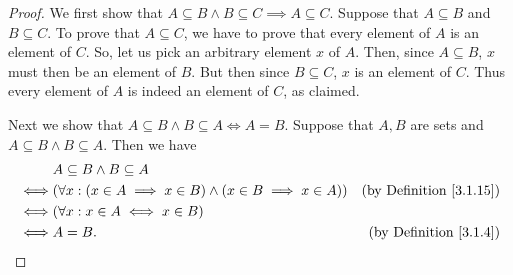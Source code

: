 \begin{proof}
    We first show that \(A \subseteq B \land B \subseteq C \implies A \subseteq C\).
    Suppose that \(A \subseteq B\) and \(B \subseteq C\).
    To prove that \(A \subseteq C\), we have to prove that every element of \(A\) is an element of \(C\).
    So, let us pick an arbitrary element \(x\) of \(A\).
    Then, since \(A \subseteq B\), \(x\) must then be an element of \(B\).
    But then since \(B \subseteq C\), \(x\) is an element of \(C\).
    Thus every element of \(A\) is indeed an element of \(C\), as claimed.

    Next we show that \(A \subseteq B \land B \subseteq A \iff A = B\).
    Suppose that \(A, B\) are sets and \(A \subseteq B \land B \subseteq A\).
    Then we have
    \begin{align*}
             & A \subseteq B \land B \subseteq A                                                                               \\
        \iff & (\forall x : (x \in A \implies x \in B) \land (x \in B \implies x \in A)) & \text{(by Definition \ref{3.1.15})} \\
        \iff & (\forall x : x \in A \iff x \in B)                                                                              \\
        \iff & A = B.                                                                    & \text{(by Definition \ref{3.1.4})}
    \end{align*}


\end{proof}
